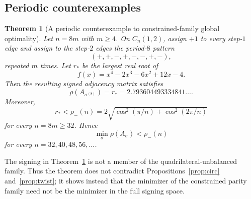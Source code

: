 \documentclass[11pt]{article}
\newtheorem{theorem}[lemma]{Theorem}
\theoremstyle{remark}
\newcommand{\rhomax}{\rho}
\begin{document}
\subsection{Periodic counterexamples}

\begin{theorem}[A periodic counterexample to constrained-family global optimality]\label{thm:counterexample}
Let $n=8m$ with $m\ge4$. On $C_n(1,2)$, assign $+1$ to every
step-$1$ edge and assign to the step-$2$ edges the period-$8$ pattern
\[
(+,+,-,+,-,-,+,-),
\]
repeated $m$ times. Let $r_*$ be the largest real root of
\[
f(x)=x^4-2x^3-6x^2+12x-4.
\]
Then the resulting signed adjacency matrix satisfies
\[
\rhomax(A_{\sigma^{(8)}})=r_*
=2.793604493334841\ldots .
\]
Moreover,
\[
r_*<\rho_-(n)
=2\sqrt{\cos^2(\pi/n)+\cos^2(2\pi/n)}
\]
for every $n=8m\ge32$. Hence
\[
\boxed{\min_\sigma\rhomax(A_\sigma)<\rho_-(n)}
\]
for every $n=32,40,48,56,\ldots$.
\end{theorem}

The signing in Theorem~\ref{thm:counterexample} is not a member of the
quadrilateral-unbalanced family. Thus the theorem does not contradict
Propositions~\ref{prop:circ} and~\ref{prop:twist}; it shows instead that
the minimizer of the constrained parity family need not be the minimizer
in the full signing space.
\end{document}
